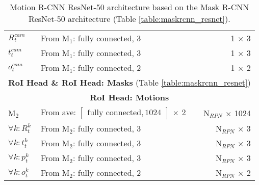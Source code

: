 {\begin{table}[h]
\begin{tabular}{llr}
$R_t^{cam}$& From M$_1$: fully connected, 3 & 1 $\times$ 3 \\
$t_t^{cam}$& From M$_1$: fully connected, 3 & 1 $\times$ 3 \\
$o_t^{cam}$& From M$_1$: fully connected, 2 & 1 $\times$ 2 \\
\midrule
\multicolumn{3}{c}{\textbf{RoI Head \& RoI Head: Masks} (Table \ref{table:maskrcnn_resnet})}\\
\midrule
\multicolumn{3}{c}{\textbf{RoI Head: Motions}}\\
\midrule
M$_2$ & From ave: $\begin{bmatrix}\textrm{fully connected}, 1024\end{bmatrix}$ $\times$ 2 & N$_{RPN}$ $\times$ 1024 \\
$\forall k: R_t^k$ & From M$_2$: fully connected, 3 & N$_{RPN}$ $\times$ 3 \\
$\forall k: t_t^k$ & From M$_2$: fully connected, 3 & N$_{RPN}$ $\times$ 3 \\
$\forall k: p_t^k$ & From M$_2$: fully connected, 3 & N$_{RPN}$ $\times$ 3 \\
$\forall k: o_t^k$ & From M$_2$: fully connected, 2 & N$_{RPN}$ $\times$ 2 \\

\bottomrule
\end{tabular}

\caption {
Motion R-CNN ResNet-50 architecture based on the Mask R-CNN
ResNet-50 architecture (Table \ref{table:maskrcnn_resnet}).
}
\label{table:motionrcnn_resnet}
\end{table}
}

